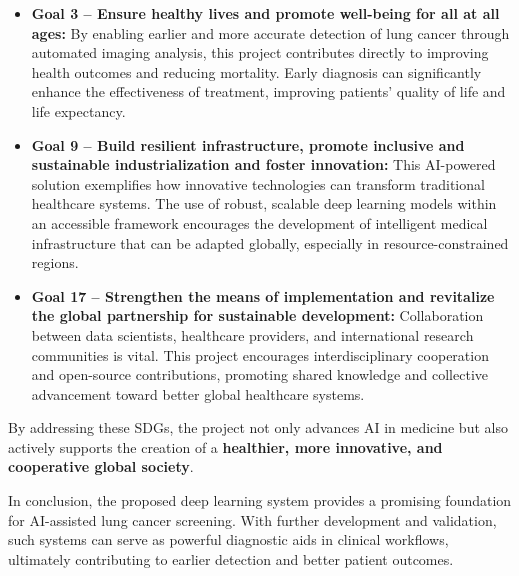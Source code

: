\begin{itemize}
    \item \textbf{Goal 3 – Ensure healthy lives and promote well-being for all at all ages:} By 
    enabling earlier and more accurate detection of lung cancer through automated imaging analysis, 
    this project contributes directly to improving health outcomes and reducing mortality. Early 
    diagnosis can significantly enhance the effectiveness of treatment, improving patients' quality 
    of life and life expectancy.
    
    \item \textbf{Goal 9 – Build resilient infrastructure, promote inclusive and sustainable 
    industrialization and foster innovation:} This AI-powered solution exemplifies how innovative 
    technologies can transform traditional healthcare systems. The use of robust, scalable deep 
    learning models within an accessible framework encourages the development of intelligent medical 
    infrastructure that can be adapted globally, especially in resource-constrained regions.
    
    \item \textbf{Goal 17 – Strengthen the means of implementation and revitalize the global 
    partnership for sustainable development:} Collaboration between data scientists, healthcare 
    providers, and international research communities is vital. This project encourages 
    interdisciplinary cooperation and open-source contributions, promoting shared knowledge and 
    collective advancement toward better global healthcare systems.
\end{itemize}

\newpage

By addressing these SDGs, the project not only advances AI in medicine but also actively supports 
the creation of a \textbf{healthier, more innovative, and cooperative global society}.

In conclusion, the proposed deep learning system provides a promising foundation for AI-assisted 
lung cancer screening. With further development and validation, such systems can serve as powerful 
diagnostic aids in clinical workflows, ultimately contributing to earlier detection and better 
patient outcomes.
